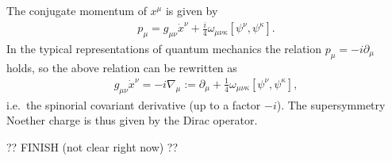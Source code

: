     The conjugate momentum of $x^\mu$ is given by
    \begin{gather}
        p_\mu = g_{\mu\nu}\dot{x}^\nu + \frac{i}{4}\omega_{\mu\nu\kappa}[\psi^\nu,\psi^\kappa].
    \end{gather}
    In the typical representations of quantum mechanics the relation $p_\mu = -i\partial_\mu$ holds, so the above relation can be rewritten as
    \begin{gather}
        g_{\mu\nu}\dot{x}^\nu = -i\nabla_\mu := \partial_\mu + \frac{1}{4}\omega_{\mu\nu\kappa}[\psi^\nu,\psi^\kappa],
    \end{gather}
    i.e.~the spinorial covariant derivative (up to a factor $-i$). The supersymmetry Noether charge is thus given by the Dirac operator.

    ?? FINISH (not clear right now)  ??